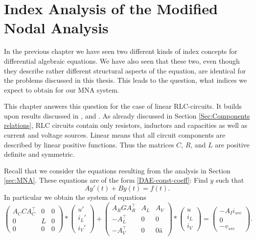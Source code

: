 \chapter{Index Analysis of the Modified Nodal Analysis}
\label{sec:index analysis of the modified nodal analysis}


In the previous chapter we have seen two different kinds of index concepts for differential algebraic equations. We have also seen that these two, even though they describe rather different structural aspects of the equation, are identical for the problems discussed in this thesis. %
This leads to the question, what indices we expect to obtain for our MNA system.

This chapter answers this question for the case of linear RLC-circuits. It builds upon results discussed in \cite{ModellingAndDiscretizationOfCircuitProblems}, \cite{NumerikGewöhnlicherDifferentialgleichungen} and \cite{shashkov_tuprints27452}.
As already discussed in Section \ref{Sec:Components relations}, RLC circuits contain only resistors, inductors and capacities as well as current and voltage sources. Linear means that all circuit components are described by linear positive functions. Thus the matrices $C$, $R$, and $L$ are positive definite and symmetric.

Recall that we consider the equations resulting from the analysis in Section \ref{sec:MNA}. These equations are of the form \eqref{DAE-const-coeff}: Find $y$ such that
\begin{displaymath}
	A y'(t) + B y(t) = f(t).
\end{displaymath}
In particular we obtain the system of equations
\begin{displaymath}
	\begin{pmatrix}
		A_C C A_C^\top & 0 & 0 \\
		0 & L & 0 \\
		0 & 0 & 0
	\end{pmatrix}
	*
	\begin{pmatrix}
		u' \\
		i_L' \\
		i_V'
	\end{pmatrix}
	+
	\begin{pmatrix}
		A_R G A_R^\top & A_L & A_V \\
		-A_L^\top & 0 & 0 \\
		-A_V^\top & 0 & 0 ä
	\end{pmatrix}
	*
	\begin{pmatrix}
		u \\
		i_L \\
		i_V
	\end{pmatrix}
	=
	\begin{pmatrix}
		-A_I i_{src} \\
		0 \\
		-v_{src}
	\end{pmatrix}.
\end{displaymath}

